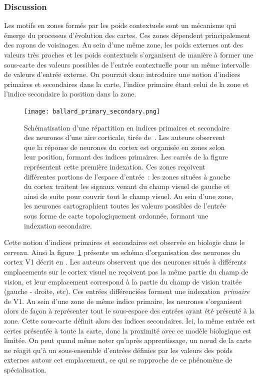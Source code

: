 \documentclass[../main]{subfiles}
\begin{document}
\subsubsection{Discussion}

Les motifs en zones formés par les poids contextuels sont un mécanisme qui émerge du processus d'évolution des cartes. Ces zones dépendent principalement des rayons de voisinages.
Au sein d'une même zone, les poids externes ont des valeurs très proches et les poids contextuels s'organisent de manière à former une sous-carte des valeurs possibles de l'entrée contextuelle pour un même intervalle de valeurs d'entrée externe.
On pourrait donc introduire une notion d'indices primaires et secondaires dans la carte, l'indice primaire étant celui de la zone et l'indice secondaire la position dans la zone.

\begin{figure}[H]
	\centering\texttt{[image: ballard\_primary\_secondary.png]}
	\caption{Schématisation d'une répartition en indices primaires et secondaire des neurones d'une aire corticale, tirée de~\cite{ballard_cortical_1986}. 
	Les auteurs observent que la réponse de neurones du cortex est organisée en zones selon leur position, formant des indices primaires. Les carrés de la figure représentent cette première indexation.
	Ces zones reçoivent différentes portions de l'espace d'entrée~: les zones situées à gauche du cortex traitent les signaux venant du champ visuel de gauche et ainsi de suite pour couvrir tout le champ visuel.
	Au sein d'une zone, les neurones cartographient toutes les valeurs possibles de l'entrée sous forme de carte topologiquement ordonnée, formant une indexation secondaire. \label{fig:ballard}}
\end{figure}


Cette notion d'indices primaires et secondaires est observée en biologie dans le cerveau. 
Ainsi la figure~\ref{fig:ballard} présente un schéma d'organisation des neurones du cortex V1 décrit en \cite{ballard_cortical_1986}.
Les auteurs observent que des neurones situés à différents emplacements sur le cortex visuel ne reçoivent pas la même partie du champ de vision, et leur emplacement correspond à la partie du champ de vision traitée (gauche - droite, etc).
Ces entrées différenciées forment une indexation~\emph{primaire} de V1. 
Au sein d'une zone de même indice primaire, les neurones s'organisent alors de façon à représenter tout le sous-espace des entrées ayant été présenté à la zone. Cette sous-carte définit alors des indices secondaires.
Ici, la même entrée est certes présentée à toute la carte, donc la proximité avec ce modèle biologique est limitée. On peut quand même noter qu'après apprentissage, un n\oe{}ud de la carte ne réagit qu'à un sous-ensemble d'entrées définies par les valeurs des poids externes autour cet emplacement, ce qui se rapproche de ce phénomène de spécialisation.
\end{document}
